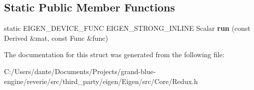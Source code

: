 \subsection*{Static Public Member Functions}
\begin{DoxyCompactItemize}
\item 
\mbox{\label{struct_eigen_1_1internal_1_1redux__impl_3_01_func_00_01_derived_00_01_linear_vectorized_traversal_00_01_complete_unrolling_01_4_a6754e76fe3d22a79a501da7f826f67c9}} 
static E\+I\+G\+E\+N\+\_\+\+D\+E\+V\+I\+C\+E\+\_\+\+F\+U\+NC E\+I\+G\+E\+N\+\_\+\+S\+T\+R\+O\+N\+G\+\_\+\+I\+N\+L\+I\+NE Scalar {\bfseries run} (const Derived \&mat, const Func \&func)
\end{DoxyCompactItemize}


The documentation for this struct was generated from the following file\+:\begin{DoxyCompactItemize}
\item 
C\+:/\+Users/dante/\+Documents/\+Projects/grand-\/blue-\/engine/reverie/src/third\+\_\+party/eigen/\+Eigen/src/\+Core/Redux.\+h\end{DoxyCompactItemize}
